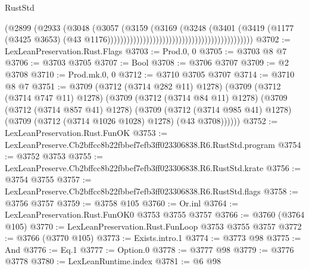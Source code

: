 \begin{lexlean}{RustStd}
\begin{coremodule}
                                                                        (@2899
                                                                          (@2933
                                                                            (@3048
                                                                              (@3057
                                                                                (@3159
                                                                                  (@3169
                                                                                    (@3248
                                                                                      (@3401
                                                                                        (@3419
                                                                                          (@1177
                                                                                            (@3425
                                                                                              @3653)
                                                                                            (@43
                                                                                              @1176)))))))))))))))))))))))))))))))))))))))))))))
@3702 := LexLeanPreservation.Rust.Flags
@3703 := Prod.{0, 0}
@3705 := @3703 @8 @7
@3706 := @3703 @3705
@3707 := Bool
@3708 := @3706 @3707
@3709 := @2 @3708
@3710 := Prod.mk.{0, 0}
@3712 := @3710 @3705 @3707
@3714 := @3710 @8 @7
@3751 := @3709
    (@3712 (@3714 @282 @11) @1278)
    (@3709
      (@3712 (@3714 @747 @11) @1278)
      (@3709
        (@3712 (@3714 @84 @11) @1278)
        (@3709
          (@3712 (@3714 @857 @41) @1278)
          (@3709
            (@3712 (@3714 @985 @41) @1278)
            (@3709 (@3712 (@3714 @1026 @1028) @1278) (@43 @3708))))))
@3752 := LexLeanPreservation.Rust.FunOK
@3753 := LexLeanPreserve.Cb2bffcc8b22fbbef7efb3ff023306838.R6.RustStd.program
@3754 := @3752 @3753
@3755 := LexLeanPreserve.Cb2bffcc8b22fbbef7efb3ff023306838.R6.RustStd.krate
@3756 := @3754 @3755
@3757 := LexLeanPreserve.Cb2bffcc8b22fbbef7efb3ff023306838.R6.RustStd.flags
@3758 := @3756 @3757
@3759 := @3758 @105
@3760 := Or.inl
@3764 := LexLeanPreservation.Rust.FunOK0 @3753 @3755 @3757
@3766 := @3760 (@3764 @105)
@3770 := LexLeanPreservation.Rust.FunLoop @3753 @3755 @3757
@3772 := @3766 (@3770 @105)
@3773 := Exists.intro.{1}
@3774 := @3773 @98
@3775 := And
@3776 := Eq.{1}
@3777 := Option.{0}
@3778 := @3777 @98
@3779 := @3776 @3778
@3780 := LexLeanRuntime.index
@3781 := @6 @98

\end{coremodule}
\end{lexlean}
